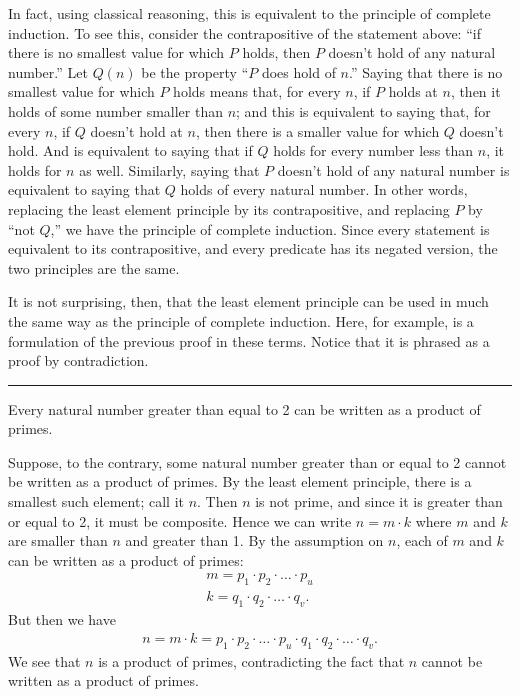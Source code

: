 \documentclass[letterpaper,10pt,english]{sphinxmanual}
\begin{document}
\sphinxAtStartPar
In fact, using classical reasoning, this is equivalent to the principle of complete induction. To see this, consider the contrapositive of the statement above: “if there is no smallest value for which \(P\) holds, then \(P\) doesn’t hold of any natural number.” Let \(Q(n)\) be the property “\(P\) does  hold of \(n\).” Saying that there is no smallest value for which \(P\) holds means that, for every \(n\), if \(P\) holds at \(n\), then it holds of some number smaller than \(n\); and this is equivalent to saying that, for every \(n\), if \(Q\) doesn’t hold at \(n\), then there is a smaller value for which \(Q\) doesn’t hold. And  is equivalent to saying that if \(Q\) holds for every number less than \(n\), it holds for \(n\) as well. Similarly, saying that \(P\) doesn’t hold of any natural number is equivalent to saying that \(Q\) holds of every natural number. In other words, replacing the least element principle by its contrapositive, and replacing \(P\) by “not \(Q\),” we have the principle of complete induction. Since every statement is equivalent to its contrapositive, and every predicate has its negated version, the two principles are the same.

\sphinxAtStartPar
It is not surprising, then, that the least element principle can be used in much the same way as the principle of complete induction. Here, for example, is a formulation of the previous proof in these terms. Notice that it is phrased as a proof by contradiction.


\bigskip\hrule\bigskip


\sphinxAtStartPar
{} Every natural number greater than equal to 2 can be written as a product of primes.

\sphinxAtStartPar
{} Suppose, to the contrary, some natural number greater than or equal to 2 cannot be written as a product of primes. By the least element principle, there is a smallest such element; call it \(n\). Then \(n\) is not prime, and since it is greater than or equal to 2, it must be composite. Hence we can write \(n = m \cdot k\) where \(m\) and \(k\) are smaller than \(n\) and greater than 1. By the assumption on \(n\), each of \(m\) and \(k\) can be written as a product of primes:
\begin{equation*}
\begin{split}m = p_1 \cdot p_2 \cdot \ldots \cdot p_u \\
k = q_1 \cdot q_2 \cdot \ldots \cdot q_v.\end{split}
\end{equation*}
\sphinxAtStartPar
But then we have
\begin{equation*}
\begin{split}n = m \cdot k = p_1 \cdot p_2 \cdot \ldots \cdot p_u \cdot q_1 \cdot
q_2 \cdot \ldots \cdot q_v.\end{split}
\end{equation*}
\sphinxAtStartPar
We see that \(n\) is a product of primes, contradicting the fact that \(n\) cannot be
written as a product of primes.
\end{document}
